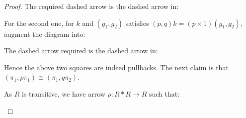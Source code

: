 \documentclass[a4paper]{article}
\DeclareMathOperator{\pr}{\sf pr}
\begin{document}
\begin{proof}
    The required dashed arrow is the dashed arrow in:

    \begin{center}
    \end{center}

    For the second one, for $k$ and $(g_1,g_2)$ satisfies $(p,q)k=(p\times 1)(g_1,g_2)$, augment the diagram into:

    \begin{center}
    \end{center}

    The dashed arrow required is the dashed arrow in:

    \begin{center}
    \end{center}

    Hence the above two squares are indeed pullbacks. The next claim is that $(\pi_1,p\pi_1)\cong (\pi_1,q\pi_2)$. 

    As $R$ is transitive, we have arrow $\rho:R*R\to R$ such that:
    \begin{center}
    \end{center}


\end{proof}
\end{document}
